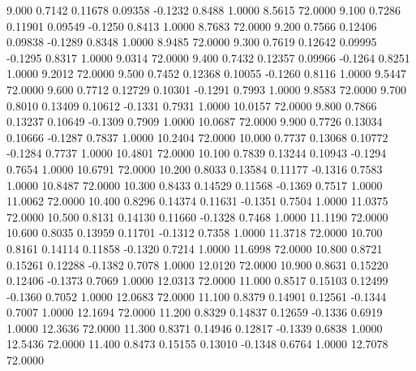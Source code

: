    9.000   0.7142   0.11678   0.09358  -0.1232   0.8488   1.0000   8.5615  72.0000
   9.100   0.7286   0.11901   0.09549  -0.1250   0.8413   1.0000   8.7683  72.0000
   9.200   0.7566   0.12406   0.09838  -0.1289   0.8348   1.0000   8.9485  72.0000
   9.300   0.7619   0.12642   0.09995  -0.1295   0.8317   1.0000   9.0314  72.0000
   9.400   0.7432   0.12357   0.09966  -0.1264   0.8251   1.0000   9.2012  72.0000
   9.500   0.7452   0.12368   0.10055  -0.1260   0.8116   1.0000   9.5447  72.0000
   9.600   0.7712   0.12729   0.10301  -0.1291   0.7993   1.0000   9.8583  72.0000
   9.700   0.8010   0.13409   0.10612  -0.1331   0.7931   1.0000  10.0157  72.0000
   9.800   0.7866   0.13237   0.10649  -0.1309   0.7909   1.0000  10.0687  72.0000
   9.900   0.7726   0.13034   0.10666  -0.1287   0.7837   1.0000  10.2404  72.0000
  10.000   0.7737   0.13068   0.10772  -0.1284   0.7737   1.0000  10.4801  72.0000
  10.100   0.7839   0.13244   0.10943  -0.1294   0.7654   1.0000  10.6791  72.0000
  10.200   0.8033   0.13584   0.11177  -0.1316   0.7583   1.0000  10.8487  72.0000
  10.300   0.8433   0.14529   0.11568  -0.1369   0.7517   1.0000  11.0062  72.0000
  10.400   0.8296   0.14374   0.11631  -0.1351   0.7504   1.0000  11.0375  72.0000
  10.500   0.8131   0.14130   0.11660  -0.1328   0.7468   1.0000  11.1190  72.0000
  10.600   0.8035   0.13959   0.11701  -0.1312   0.7358   1.0000  11.3718  72.0000
  10.700   0.8161   0.14114   0.11858  -0.1320   0.7214   1.0000  11.6998  72.0000
  10.800   0.8721   0.15261   0.12288  -0.1382   0.7078   1.0000  12.0120  72.0000
  10.900   0.8631   0.15220   0.12406  -0.1373   0.7069   1.0000  12.0313  72.0000
  11.000   0.8517   0.15103   0.12499  -0.1360   0.7052   1.0000  12.0683  72.0000
  11.100   0.8379   0.14901   0.12561  -0.1344   0.7007   1.0000  12.1694  72.0000
  11.200   0.8329   0.14837   0.12659  -0.1336   0.6919   1.0000  12.3636  72.0000
  11.300   0.8371   0.14946   0.12817  -0.1339   0.6838   1.0000  12.5436  72.0000
  11.400   0.8473   0.15155   0.13010  -0.1348   0.6764   1.0000  12.7078  72.0000
